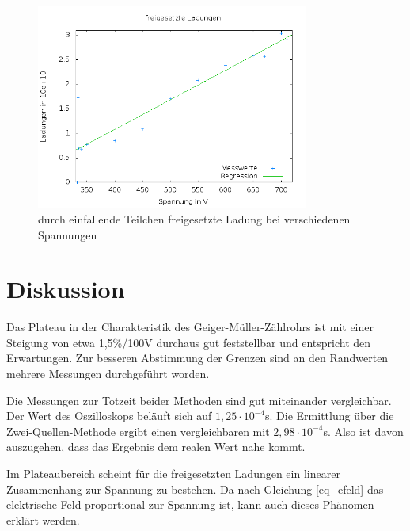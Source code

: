 \begin{figure}[H]
 \includegraphics[width=0.8\textwidth]{pics/ladungen.png}
 \caption{durch einfallende Teilchen freigesetzte Ladung bei verschiedenen Spannungen}
 \label{pic_ladung}
\end{figure}

\section{Diskussion}
Das Plateau in der Charakteristik des Geiger-Müller-Zählrohrs ist mit einer Steigung von etwa 1,5\%/100V durchaus gut feststellbar
und entspricht den Erwartungen. Zur besseren Abstimmung der Grenzen sind an den Randwerten mehrere Messungen durchgeführt worden. 

Die Messungen zur Totzeit beider Methoden sind gut miteinander vergleichbar. Der Wert des Oszilloskops beläuft sich auf
$1,25 \cdot 10^{-4}$s. Die Ermittlung über die Zwei-Quellen-Methode ergibt einen vergleichbaren mit $2,98 \cdot 10^{-4}$s. Also ist
davon auszugehen, dass das Ergebnis dem realen Wert nahe kommt.

Im Plateaubereich scheint für die freigesetzten Ladungen ein linearer Zusammenhang zur Spannung zu bestehen. Da nach Gleichung \eqref{eq_efeld}
das elektrische Feld proportional zur Spannung ist, kann auch dieses Phänomen erklärt werden.




